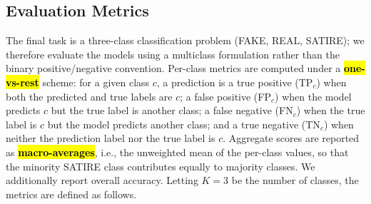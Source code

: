 \documentclass[informatics,article,accept,pdftex,moreauthors]{Definitions/mdpi}
\begin{document}
\subsection{Evaluation Metrics}
The final task is a three-class classification problem (FAKE, REAL, SATIRE); we therefore evaluate the models using a multiclass formulation rather than the binary positive/negative convention. Per-class metrics are computed under a \textbf{\hl{one-vs-rest}} scheme: for a given class $c$, a prediction is a true positive (TP$_c$) when both the predicted and true labels are $c$; a false positive (FP$_c$) when the model predicts $c$ but the true label is another class; a false negative (FN$_c$) when the true label is $c$ but the model predicts another class; and a true negative (TN$_c$) when neither the prediction label nor the true label is $c$. Aggregate scores are reported as \textbf{\hl{macro-averages}}, i.e., the unweighted mean of the per-class values, so that the minority SATIRE class contributes equally to majority classes. We additionally report overall accuracy. Letting $K=3$ be the number of classes, the metrics are defined as follows.
\end{document}
